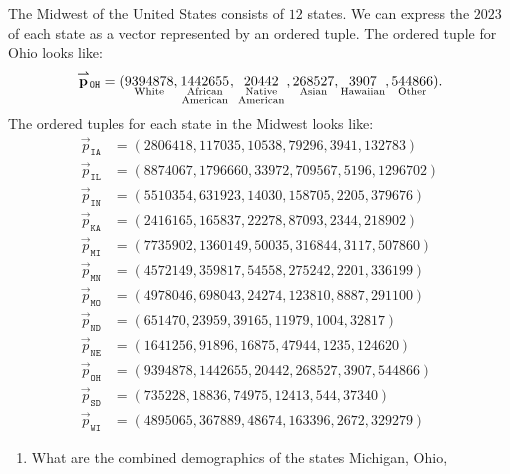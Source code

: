 \documentclass{ximera}
\begin{document}
\begin{example} %
  The Midwest of the United States consists of $12$ states. We can
  express the $2023$
  of each state as a vector represented by an ordered tuple. The
  ordered tuple for Ohio looks like:
  \[
  \vec{p}_{\texttt{OH}} = (\underset{\text{White}}{9394878},\underset{\begin{smallmatrix}\text{\scriptsize African}\\ \text{\scriptsize American}\end{smallmatrix}}{1442655},\underset{\begin{smallmatrix}\text{\scriptsize Native}\\\text{\scriptsize American}\end{smallmatrix}}{20442},\underset{\text{Asian}}{268527},\underset{\text{Hawaiian}}{3907},\underset{\text{Other}}{544866}).
  \]
  The ordered tuples for each state in the Midwest looks like:
\begin{align*}
  \vec{p}_{\texttt{IA}} &= (2806418,117035,10538,79296,3941,132783)\\
  \vec{p}_{\texttt{IL}} &= (8874067,1796660,33972,709567,5196,1296702)\\
  \vec{p}_{\texttt{IN}} &= (5510354,631923,14030,158705,2205,379676)\\
  \vec{p}_{\texttt{KA}} &= (2416165,165837,22278,87093,2344,218902)\\
  \vec{p}_{\texttt{MI}} &= (7735902,1360149,50035,316844,3117,507860)\\
  \vec{p}_{\texttt{MN}} &= (4572149,359817,54558,275242,2201,336199)\\
  \vec{p}_{\texttt{MO}} &= (4978046,698043,24274,123810,8887,291100)\\
  \vec{p}_{\texttt{ND}} &= (651470,23959,39165,11979,1004,32817)\\
  \vec{p}_{\texttt{NE}} &= (1641256,91896,16875,47944,1235,124620)\\
  \vec{p}_{\texttt{OH}} &= (9394878,1442655,20442,268527,3907,544866)\\
  \vec{p}_{\texttt{SD}} &= (735228,18836,74975,12413,544,37340)\\
  \vec{p}_{\texttt{WI}} &= (4895065,367889,48674,163396,2672,329279)
\end{align*}
\begin{enumerate}
\item What are the combined demographics of the states Michigan, Ohio,

\end{enumerate}
\end{example}
\end{document}
